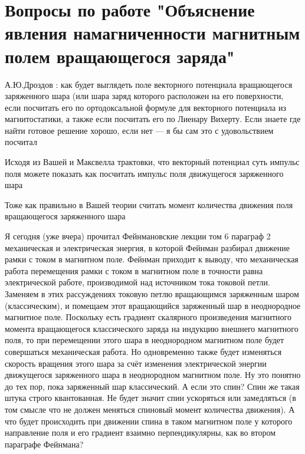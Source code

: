 \documentclass{article}
\begin{document}
\section{Вопросы по работе "Объяснение явления намагниченности магнитным полем вращающегося заряда"}
А.Ю.Дроздов : 
как будет выглядеть поле векторного потенциала вращающегося заряженного шара (или шара заряд которого расположен на его поверхности, если посчитать его по ортодоксальной формуле для векторного потенциала из магнитостатики, а также если посчитать его по Лиенару Вихерту. Если знаете где найти готовое решение хорошо, если нет — я бы сам это с удовольствием посчитал

Исходя из Вашей и Максвелла трактовки, что векторный потенциал суть импульс поля можете показать как посчитать импульс поля движущегося заряженного шара

Тоже как правильно в Вашей теории считать момент количества движения поля вращающегося заряженного шара

Я сегодня (уже вчера) прочитал Фейнмановские лекции том 6 параграф 2 механическая и электрическая энергия, в которой Фейнман разбирал движение рамки с током в магнитном поле. Фейнман приходит к выводу, что механическая работа перемещения рамки с током в магнитном поле в точности равна электрической работе, производимой над источником тока токовой петли. Заменяем в этих рассуждениях токовую петлю вращающимся заряженным шаром (классическим), и помещаем этот вращающийся заряженный шар в неоднородное магнитное поле. Поскольку есть градиент скалярного произведения магнитного момента вращающегося классического заряда на индукцию внешнего магнитного поля, то при перемещении этого шара в неоднородном магнитном поле будет совершаться механическая работа. Но одновременно также будет изменяться скорость вращения этого шара за счёт изменения электрической энергии движущегося заряженного шара в неоднородном магнитном поле. Ну это понятно до тех пор, пока заряженный шар классический. А если это спин? Спин же такая штука строго квантованная. Не будет значит спин ускоряться или замедляться (в том смысле что не должен меняться спиновый момент количества движения). А что будет происходить  при движении спина в таком магнитном поле у которого направление поля и его градиент взаимно перпендикулярны, как во втором параграфе Фейнмана?
\end{document}
